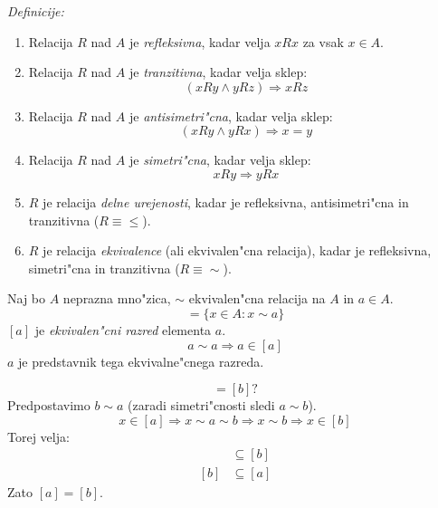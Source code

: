 \emph{Definicije:}
\begin{enumerate}[(1)]
	\item Relacija $R$ nad $A$ je \emph{refleksivna}, kadar velja $x R x$ za vsak $x \in A$.
	\item Relacija $R$ nad $A$ je \emph{tranzitivna}, kadar velja sklep:
	\begin{equation*}
	(x R y \land y R z) \Rightarrow x R z
	\end{equation*}
	
	\item Relacija $R$ nad $A$ je \emph{antisimetri"cna}, kadar velja sklep:
	\begin{equation*}
	(x R y \land y R x) \Rightarrow x = y
	\end{equation*}
	
	\item Relacija $R$ nad $A$ je \emph{simetri"cna}, kadar velja sklep:
	\begin{equation*}
	x R y \Rightarrow y R x
	\end{equation*}
	
	\item $R$ je relacija \emph{delne urejenosti}, kadar je refleksivna, antisimetri"cna in tranzitivna ($R \equiv \leq$).
	
	\item $R$ je relacija \emph{ekvivalence} (ali ekvivalen"cna relacija), kadar je refleksivna, simetri"cna in tranzitivna ($R \equiv \sim$).
\end{enumerate}

Naj bo $A$ neprazna mno"zica, $\sim$ ekvivalen"cna relacija na $A$ in $a \in A$.
\begin{equation*}
[a] = \{x \in A: x \sim a\}
\end{equation*}
$[a]$ je \emph{ekvivalen"cni razred} elementa $a$.
%
\begin{equation*}
a \sim a \Rightarrow a \in [a]
\end{equation*}
%
$a$ je predstavnik tega ekvivalne"cnega razreda.

\begin{equation*}
[a] = [b] ?
\end{equation*}
Predpostavimo $b \sim a$ (zaradi simetri"cnosti sledi $a \sim b$).
\begin{equation*}
x \in [a] \Rightarrow x \sim a \sim b \Rightarrow x \sim b \Rightarrow x \in [b]
\end{equation*}
Torej velja:
\begin{align*}
[a] &\subseteq [b]\\
[b] &\subseteq [a]
\end{align*}
Zato $[a] = [b]$.

